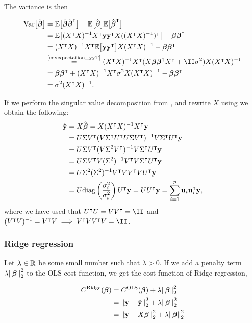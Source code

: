The variance is then 

\begin{align}\label{eq:variance_of_optimal_beta_ols}
    \variance{\optbeta} &= \EE{\optbeta \optbeta\TT} -\EE{\optbeta} \EE{\optbeta\TT} \nonumber \\
    &= \EE{\invhessian X\TT  \vec{y} \vec{y}\TT X (\invhessian)\TT} - \svec{\beta} \svec{\beta}\TT \nonumber \\
    &= \invhessian X\TT \EE{ \vec{y} \vec{y}\TT } X \invhessian - \svec{\beta} \svec{\beta}\TT \nonumber \\
    &\stackrel{\text{\eqref{eq:expectation_yyT}}}{=}\invhessian X\TT ( X\svec{\beta} \svec{\beta}\TT X\TT+ \II\sigma^2) X \invhessian \nonumber \\
    &= \svec{\beta} \svec{\beta} \TT + \invhessian X\TT \sigma^2 X \invhessian - \svec{\beta} \svec{\beta} \TT \nonumber \\
    &= \sigma^2 \invhessian.
\end{align}

If we perform the singular value decomposition from , and rewrite $X$ using  we obtain the following:
\begin{align}\label{eq:ols_svd}
    \tilde{\mathbf{y}} &= X\hat{\boldsymbol{\beta}} = X(X^\intercal X)^{-1} X^\intercal \mathbf{y} \nonumber\\
    &= U\Sigma V^\intercal(V\Sigma^\intercal U^\intercal U\Sigma V^\intercal)^{-1}V\Sigma^\intercal U^\intercal\mathbf{y} \nonumber\\
    &= U\Sigma V^\intercal(V\Sigma^2V^\intercal)^{-1}V\Sigma^\intercal U^\intercal\mathbf{y}\nonumber \\
    &= U\Sigma V^\intercal V(\Sigma^2)^{-1}V^\intercal V\Sigma^\intercal U^\intercal\mathbf{y}\nonumber \\
    &= U\Sigma^2(\Sigma^2)^{-1}V^\intercal V V^\intercal VU^\intercal\mathbf{y} \nonumber\\
    &= U\text{diag}\left(\frac{\sigma_i^2}{\sigma_i^2}\right)U^\intercal\mathbf{y} = UU^\intercal\mathbf{y} = \sum_{i=1}^p\mathbf{u}_i\mathbf{u}^\intercal_i\mathbf{y},
\end{align}
where we have used that $\UT U = V\VT = \II$ and $(\VT V)^{-1} = \VT V \implies \VT V \VT V = \II$. 


\subsubsection{Ridge regression}\label{sec:Ridge}

Let $\lambda \in \mathbb{R}^{}$ be some small number such that $\lambda >0$. If we add a penalty term $\lambda \norm{\boldsymbol{\beta}}_2^2$ to the OLS cost function, we get the cost function of Ridge regression,

\begin{align*}
    C^\text{Ridge}(\boldsymbol{\beta}) &=  C^\text{OLS}(\boldsymbol{\beta}) + \lambda \norm{\boldsymbol{\beta}}_2^2 \\
    &=\norm{\mathbf{y}-\tilde{\mathbf{y}}}_2^{2}  + \lambda \norm{\boldsymbol{\beta}}_2^2 \\
    &= \norm{\mathbf{y}-X\boldsymbol{\beta}}_2^{2} + \lambda \norm{\boldsymbol{\beta}}_2^2 
\end{align*}

